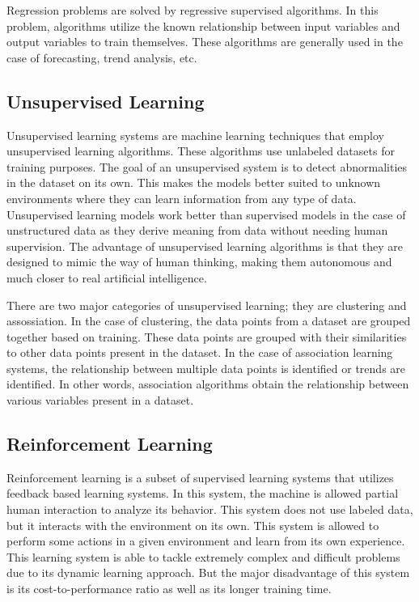 Regression problems are solved by regressive supervised algorithms. In this problem, algorithms utilize the known relationship between input variables and output variables to train themselves. These algorithms are generally used in the case of forecasting, trend analysis, etc.

\subsection{Unsupervised Learning}\label{subsec:unsupervised_learning_intro}

Unsupervised learning systems are machine learning techniques that employ unsupervised learning algorithms. These algorithms use unlabeled datasets for training purposes. The goal of an unsupervised system is to detect abnormalities in the dataset on its own. This makes the models better suited to unknown environments where they can learn information from any type of data. Unsupervised learning models work better than supervised models in the case of unstructured data as they derive meaning from data without needing human supervision. The advantage of unsupervised learning algorithms is that they are designed to mimic the way of human thinking, making them autonomous and much closer to real artificial intelligence.

There are two major categories of unsupervised learning; they are clustering and assossiation. In the case of clustering, the data points from a dataset are grouped together based on training. These data points are grouped with their similarities to other data points present in the dataset. In the case of association learning systems, the relationship between multiple data points is identified or trends are identified. In other words, association algorithms obtain the relationship between various variables present in a dataset.

\subsection{Reinforcement Learning}\label{subsec:reinforcement_learning_intro}

Reinforcement learning is a subset of supervised learning systems that utilizes feedback based learning systems. In this system, the machine is allowed partial human interaction to analyze its behavior. This system does not use labeled data, but it interacts with the environment on its own. This system is allowed to perform some actions in a given environment and learn from its own experience. This learning system is able to tackle extremely complex and difficult problems due to its dynamic learning approach. But the major disadvantage of this system is its cost-to-performance ratio as well as its longer training time.

